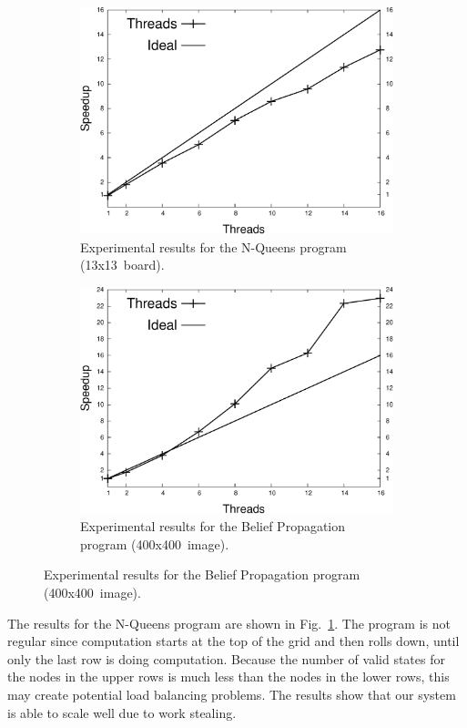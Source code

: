 \begin{figure}[h]
   \centering
   \begin{subfigure}[b]{0.40\textwidth}
      \includegraphics[width=\textwidth]{speedup_8queens-13.pdf}
      \caption{Experimental results for the N-Queens program (13x13~board).}
      \label{exp:8queens}
   \end{subfigure}
   \begin{subfigure}[b]{0.40\textwidth}
      \includegraphics[width=\textwidth]{speedup_bp-400.pdf}
      \caption{Experimental results for the Belief Propagation program (400x400~image).}
      \label{exp:bp}
   \end{subfigure}
\end{figure}

The results for the N-Queens program are shown in Fig.~\ref{exp:8queens}. The program is not regular since computation starts at the top of the grid and then rolls down, until only the last row is doing computation. Because the number of valid states for the nodes in the upper rows is much less than the nodes in the lower rows, this may create potential load balancing problems. The results show that our system is able to scale well due to work stealing.


